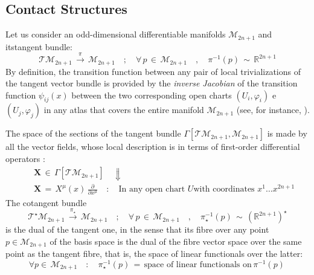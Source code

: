 \documentclass[10pt,a4paper]{article}
\begin{document}
\subsection{Contact Structures}
Let us consider an odd-dimensional differentiable manifolds
$\mathcal{M}_{2n+1}$ and itstangent bundle:
\begin{equation}\label{tangentobundolo}
    \mathcal{TM}_{2n+1} \, \stackrel{\pi}{\longrightarrow} \,
    \mathcal{M}_{2n+1} \quad ; \quad \forall \, p \,
    \in \, \mathcal{M}_{2n+1} \quad , \quad \pi^{-1}(p) \, \sim \,
    \mathbb{R}^{2n+1}
\end{equation}
By definition, the transition function between any pair of local trivializations of the tangent vector bundle is provided by the \textit{inverse Jacobian} of the transition function
$\psi_{ij}(x)$  between the two corresponding open charts
$(U_i,\varphi_i)$ e $(U_j,\varphi_j)$  in any atlas  that covers the entire manifold $\mathcal{M}_{2n+1}$ (see, for instance, \cite{fre2023book}).
\par
The space of the sections of the tangent bundle $\Gamma\left[\mathcal{TM}_{2n+1},\mathcal{M}_{2n+1}\right]$ is made by all the vector fields, whose local description is in terms of first-order differential operators :
\begin{eqnarray}\label{vettorifildi}
    &&\mathbf{X} \, \in \, \Gamma\left[\mathcal{TM}_{2n+1}\right] \quad
    \Downarrow \nonumber\\
    &&  \mathbf{X} \, = \, X^\mu \left(x\right)
    \,\frac{\partial}{\partial x^\mu} \quad : \quad \text{In any open chart $U$
    with coordinates $x^1\dots x^{2n+1}$}
\end{eqnarray}
The cotangent bundle
\begin{equation}\label{cotangentobundolo}
    \mathcal{T}^\star\mathcal{M}_{2n+1} \, \stackrel{\pi_\star}{\longrightarrow} \,
    \mathcal{M}_{2n+1} \quad ; \quad \forall \, p \,
    \in \, \mathcal{M}_{2n+1} \quad , \quad \pi_\star^{-1}(p) \, \sim \,
    \left(\mathbb{R}^{2n+1}\right)^\star
\end{equation}
is the dual of the tangent one, in the sense that its fibre over any point $p\in\mathcal{M}_{2n+1}$  of the basis space is the dual of the fibre vector space over the same point as the tangent fibre, that is, the space of linear functionals over the latter:
\begin{equation}\label{cricco}
    \forall p \in \, \mathcal{M}_{2n+1} \quad : \quad
    \pi_\star^{-1}(p) \, = \, \text{space of linear functionals on}
    \, \pi^{-1}(p)
    \,
\end{equation}
\end{document}
